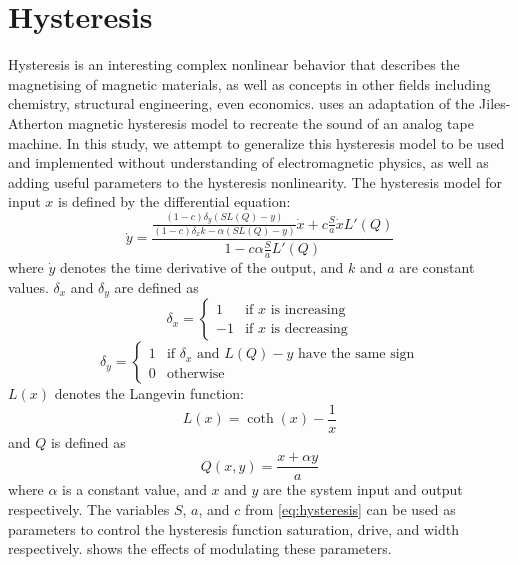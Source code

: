 \documentclass[twoside,a4paper]{article}
\begin{document}
\section{Hysteresis} \label{sec:hysteresis}
%
Hysteresis is an interesting complex nonlinear behavior
that describes the magnetising of magnetic materials, as
well as concepts in other fields including chemistry, structural engineering,
even economics. \cite{DAFX-tape} uses an adaptation of the Jiles-Atherton
magnetic hysteresis model to recreate the sound of an analog tape machine.
In this study, we attempt to generalize this hysteresis model to be used
and implemented without understanding of electromagnetic physics,
as well as adding useful parameters to the hysteresis nonlinearity.
\newline\newline
%
The hysteresis model for input $x$ is defined by the differential equation:
%
\begin{equation}
    \dot{y} = \frac{\frac{(1-c)\delta_y(SL(Q) - y)}{(1-c)\delta_xk - \alpha(SL(Q) - y)}\dot{x} + c \frac{S}{a} \dot{x} L'(Q)}{1 - c\alpha \frac{S}{a} L'(Q)}
    \label{eq:hysteresis}
\end{equation}
%
where $\dot{y}$ denotes the time derivative of the output, and $k$ and
$a$ are constant values. $\delta_x$ and $\delta_y$ are defined as
%
\begin{equation}
    \delta_x = \begin{cases} 1 & \text{if $x$ is increasing} \\ -1 & \text{if $x$ is decreasing} \end{cases}
    \label{eq:delta-x}
\end{equation}
%
\begin{equation}
    \delta_y = \begin{cases} 1 & \text{if $\delta_x$ and $L(Q) - y$ have the same sign} \\ 0 & \text{otherwise} \end{cases}
    \label{eq:delta-y}
\end{equation}
%
$L(x)$ denotes the Langevin function:
%
\begin{equation}
    L(x) = \coth(x) - \frac{1}{x}
    \label{eq:langevin}
\end{equation}
%
and $Q$ is defined as
%
\begin{equation}
    Q(x,y) = \frac{x + \alpha y}{a}
    \label{eq:hyst-q}
\end{equation}
%
where $\alpha$ is a constant value, and $x$ and $y$ are the system input
and output respectively.
\newline\newline
The variables $S$, $a$, and $c$ from \cref{eq:hysteresis} can be used
as parameters to control the hysteresis function saturation, drive,
and width respectively.  shows the effects of modulating
these parameters.
\end{document}
